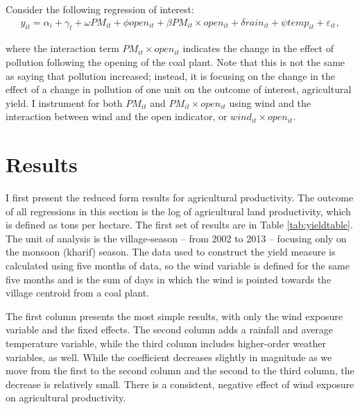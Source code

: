 \documentclass[
]{article}
\begin{document}
Consider the following regression of interest:
\begin{gather} 
y_{it} = \alpha_{i} + \gamma_{t} + \omega PM_{it} + \phi open_{it} + \beta PM_{it}\times open_{it} + \delta rain_{it} + \psi temp_{it} + \varepsilon_{it},
\end{gather}

where the interaction term \(PM_{it}\times open_{it}\) indicates the change in the effect of pollution following the opening of the coal plant. Note that this is not the same as saying that pollution increased; instead, it is focusing on the change in the effect of a change in pollution of one unit on the outcome of interest, agricultural yield. I instrument for both \(PM_{it}\) and \(PM_{it}\times open_{it}\) using wind and the interaction between wind and the open indicator, or \(wind_{it}\times open_{it}\).

\hypertarget{results}{%
\section{Results}\label{results}}

\label{results}

I first present the reduced form results for agricultural productivity. The outcome of all regressions in this section is the log of agricultural land productivity, which is defined as tons per hectare. The first set of results are in Table \ref{tab:yieldtable}. The unit of analysis is the village-season -- from 2002 to 2013 -- focusing only on the monsoon (kharif) season. The data used to construct the yield measure is calculated using five months of data, so the wind variable is defined for the same five months and is the sum of days in which the wind is pointed towards the village centroid from a coal plant.

The first column presents the most simple results, with only the wind exposure variable and the fixed effects. The second column adds a rainfall and average temperature variable, while the third column includes higher-order weather variables, as well. While the coefficient decreases slightly in magnitude as we move from the first to the second column and the second to the third column, the decrease is relatively small. There is a consistent, negative effect of wind exposure on agricultural productivity.
\end{document}
